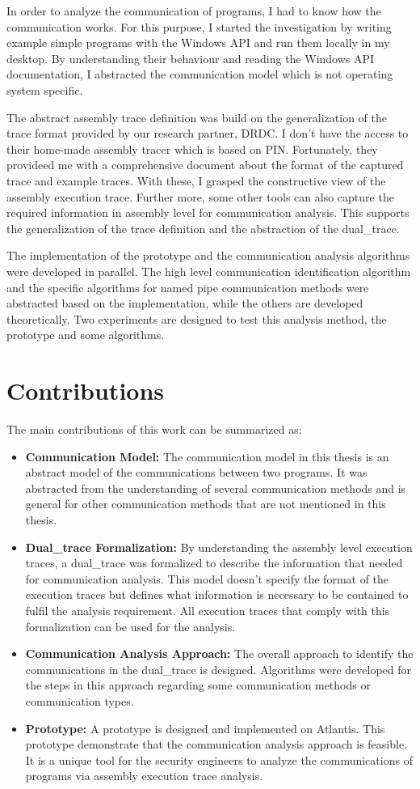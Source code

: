 In order to analyze the communication of programs, I had to know how the communication works. For this purpose, I started the investigation by writing example simple programs with the Windows API and run them locally in my desktop. By understanding their behaviour and reading the Windows API documentation, I abstracted the communication model which is not operating system specific.

The abstract assembly trace definition was build on the generalization of the trace format provided by our research partner, DRDC. I don't have the access to their home-made assembly tracer which is based on PIN\cite{_pin_????}. Fortunately, they provideed me with a comprehensive document about the format of the captured trace and example traces. With these, I grasped the constructive view of the assembly execution trace. Further more, some other tools can also capture the required information in assembly level for communication analysis. This supports the generalization of the trace definition and the abstraction of the dual\_trace.

The implementation of the prototype and the communication analysis algorithms were developed in parallel. The high level communication identification algorithm and the specific algorithms for named pipe communication methods were abstracted based on the implementation, while the others are developed theoretically. Two experiments are designed to test this analysis method, the prototype and some algorithms. 


\section{Contributions}
The main contributions of this work can be summarized as:
\begin{itemize}
  \item \textbf{Communication Model:} The communication model in this thesis is an abstract model of the communications between two programs. It was abstracted from the understanding of several communication methods and is general for other communication methods that are not mentioned in this thesis.
  \item \textbf{Dual\_trace Formalization:} By understanding the assembly level execution traces, a dual\_trace was formalized to describe the information that needed for communication analysis. This model doesn't specify the format of the execution traces but defines what information is necessary to be contained to fulfil the analysis requirement. All execution traces that comply with this formalization can be used for the analysis.
  \item \textbf{Communication Analysis Approach:} The overall approach to identify the communications in the dual\_trace is designed. Algorithms were developed for the steps in this
approach regarding some communication methods or communication types.
  \item \textbf{Prototype:} A prototype is designed and implemented on Atlantis. This prototype demonstrate that the communication analysis approach is feasible. It is a unique tool for the security engineers to analyze the communications of programs via assembly execution trace analysis.
\end{itemize}

